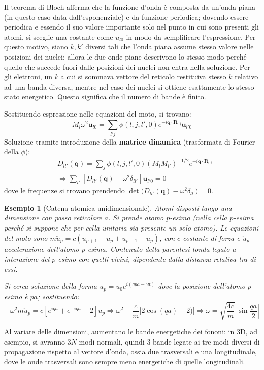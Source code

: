 \documentclass[10pt, a4paper]{scrartcl}
\numberwithin{equation}{subsection}
\theoremstyle{style1}
\theoremstyle{style2}
\newtheorem{esempio}{Esempio}[section]
\begin{document}
Il teorema di Bloch afferma che la funzione d'onda \`e composta da un'onda piana (in questo caso data dall'esponenziale) e da funzione periodica; dovendo essere periodica e essendo il suo valore importante solo nel punto in cui sono presenti gli atomi, si sceglie una costante come $u_{l 0} $ in modo da semplificare l'espressione. Per questo motivo, siano $k,k'$ diversi tali che l'onda piana assume stesso valore nelle posizioni dei nuclei; allora le due onde piane descrivono lo stesso modo perch\'e quello che succede fuori dalle posizioni dei nuclei non entra nella soluzione. Per gli elettroni, un $k$ a cui si sommava vettore del reticolo restituiva stesso $k$ relativo ad una banda diversa, mentre nel caso dei nuclei si ottiene esattamente lo stesso stato energetico. Questo significa che il numero di bande \`e finito.

Sostituendo espressione nelle equazioni del moto, si trovano:
\begin{equation}
	M_l \omega^2 \mathbf{u} _{l 0} = \sum_{l'j}^{} \phi (l,j,l',0)e^{-i\mathbf{q} \cdot \mathbf{R}_{0j} } \mathbf{u} _{l' 0} 
\end{equation}
Soluzione tramite introduzione della \textbf{matrice dinamica} (trasformata di Fourier della $\phi $):
\[
	\begin{split}
		&D_{l l'} (\mathbf{q} ) = \sum_{j}^{} \phi (l,j,l',0) (M_lM_{l'} )^{ - 1 / 2} e^{-i \mathbf{q} \cdot \mathbf{R}_{0j}  } \\
		 &\Rightarrow \sum_{l'}^{} \left[ D_{ll'} (\mathbf{q} ) - \omega^2 \delta _{l l'}  \right] \mathbf{u} _{l'0} =0
	\end{split}
\] 
dove le frequenze si trovano prendendo $\det \Big(D_{ll'} (\mathbf{q} ) - \omega^2 \delta _{l l'} \Big) =0 $.
\begin{esempio}[Catena atomica unidimensionale]
	Atomi disposti lungo una dimensione con passo reticolare $a$. Si prende atomo $p$-esimo (nella cella $p$-esima perch\'e si suppone che per cella unitaria sia presente un solo atomo). Le equazioni del moto sono $m\ddot{u}_p = c (u_{p+1} -u_p + u_{p-1} - u_p)$, con $c$ costante di forza e $\ddot{u}_p$ accelerazione dell'atomo $p$-esima. Contenuto della parentesi tonda legato a interazione del $p$-esimo con quelli vicini, dipendente dalla distanza relativa tra di essi.

	Si cerca soluzione della forma $u_p = u_0 e^{i(qpa-\omega t)} $ dove la posizione dell'atomo $p$-esimo \`e $pa$; sostituendo:
\[
-\omega^2 m \ddot{u}_p = c \left[ e^{i q a} +e^{-iqa} - 2  \right] u_p\Rightarrow \omega^2 - \frac{c}{m} \big[ 2 \cos (qa) - 2) \big] \Rightarrow \omega = \sqrt{\frac{4c}{m}} \left\lvert \sin \frac{qa}{2} \right\rvert 
\] 
\end{esempio}
Al variare delle dimensioni, aumentano le bande energetiche dei fononi: in 3D, ad esempio, si avranno $3N$ modi normali, quindi $3$ bande legate ai tre modi diversi di propagazione rispetto al vettore d'onda, ossia due trasversali e una longitudinale, dove le onde trasversali sono sempre meno energetiche di quelle longitudinali. 
\end{document}
